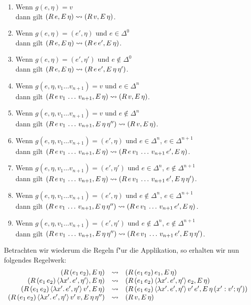 \documentclass[12pt,a4paper,draft]{article}
\begin{document}
\begin{enumerate}
\item Wenn $g(e,\eta) = v$ \\
  dann gilt $(R\,e,E\,\eta) \rightsquigarrow (R\,v,E\,\eta)$.
\item Wenn $g(e,\eta) = (e',\eta)$ und $e\in\Delta^0$ \\
  dann gilt $(R\,e,E\,\eta) \rightsquigarrow (R\,e\,e',E\,\eta)$.
\item Wenn $g(e,\eta) = (e',\eta')$ und $e\not\in\Delta^0$ \\
  dann gilt $(R\,e,E\,\eta) \rightsquigarrow (R\,e\,e',E\,\eta\,\eta')$.
\item Wenn $g(e,\eta,v_1 \ldots v_{n+1}) = v$ und $e\in\Delta^n$ \\
  dann gilt $(R\,e\,v_1\,\ldots\,v_{n+1},E\,\eta) \rightsquigarrow (R\,v,E\,\eta)$.
\item Wenn $g(e,\eta,v_1 \ldots v_{n+1}) = v$ und $e\not\in\Delta^n$ \\
  dann gilt $(R\,e\,v_1\,\ldots\,v_{n+1},E\,\eta\,\eta'') \rightsquigarrow (R\,v,E\,\eta)$.
\item Wenn $g(e,\eta,v_1 \ldots v_{n+1}) = (e',\eta)$ und $e\in\Delta^n$, $e\in\Delta^{n+1}$ \\
  dann gilt $(R\,e\,v_1\,\ldots\,v_{n+1},E\,\eta) \rightsquigarrow (R\,e\,v_1\,\ldots\,v_{n+1}\,e',E\,\eta)$.
\item Wenn $g(e,\eta,v_1 \ldots v_{n+1}) = (e',\eta')$ und $e\in\Delta^n$, $e\not\in\Delta^{n+1}$ \\
  dann gilt $(R\,e\,v_1\,\ldots\,v_{n+1},E\,\eta) \rightsquigarrow (R\,e\,v_1\,\ldots\,v_{n+1}\,e',E\,\eta\,\eta')$.
\item Wenn $g(e,\eta,v_1 \ldots v_{n+1}) = (e',\eta)$ und $e\not\in\Delta^n$, $e\in\Delta^{n+1}$ \\
  dann gilt $(R\,e\,v_1\,\ldots\,v_{n+1},E\,\eta\,\eta'') \rightsquigarrow (R\,e\,v_1\,\ldots\,v_{n+1}\,e',E\,\eta)$.
\item Wenn $g(e,\eta,v_1 \ldots v_{n+1}) = (e',\eta')$ und $e\not\in\Delta^n$, $e\not\in\Delta^{n+1}$ \\
  dann gilt $(R\,e\,v_1\,\ldots\,v_{n+1},E\,\eta\,\eta'') \rightsquigarrow (R\,e\,v_1\,\ldots\,v_{n+1}\,e',E\,\eta\,\eta')$.
\end{enumerate}
Betrachten wir wiederum die Regeln f"ur die Applikation, so erhalten wir nun folgendes Regelwerk:
\[\begin{array}{rcl}
  (R\,({e_1}\,{e_2}),E\,\eta)
  &\rightsquigarrow& (R\,({e_1}\,{e_2})\,e_1,E\,\eta) \\
  (R\,({e_1}\,{e_2})\,\langle{\lambda{x'}.\,{e'}},{\eta'}\rangle,E\,\eta)
  &\rightsquigarrow& (R\,({e_1}\,{e_2})\,\langle{\lambda{x'}.\,{e'}},{\eta'}\rangle\,e_2,E\,\eta) \\
  (R\,({e_1}\,{e_2})\,\langle{\lambda{x'}.\,{e'}},{\eta'}\rangle\,v',E\,\eta)
  &\rightsquigarrow& (R\,({e_1}\,{e_2})\,\langle{\lambda{x'}.\,{e'}},{\eta'}\rangle\,v'\,e',E\,\eta\,(x':v';\eta')) \\
  (R\,({e_1}\,{e_2})\,\langle{\lambda{x'}.\,{e'}},{\eta'}\rangle\,v'\,v,E\,\eta\,\eta'')
  &\rightsquigarrow& (R\,v,E\,\eta)
\end{array}\]
\end{document}
